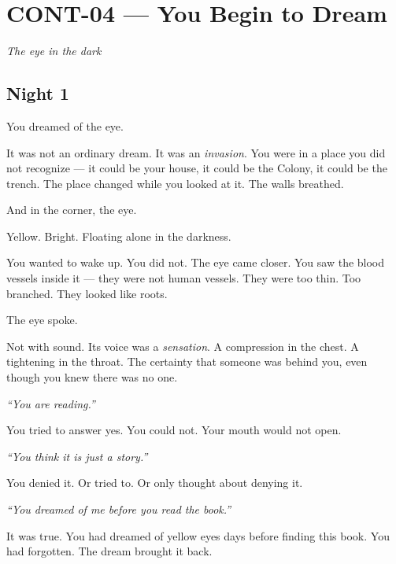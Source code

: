 \section*{\textbf{CONT-04} --- You Begin to Dream}

\noindent \textit{The eye in the dark}

\subsection*{Night 1}

\noindent You dreamed of the eye.

\noindent It was not an ordinary dream. It was an \textit{invasion}. You were in a place you did not recognize --- it could be your house, it could be the Colony, it could be the trench. The place changed while you looked at it. The walls breathed.

\noindent And in the corner, the eye.

\noindent Yellow. Bright. Floating alone in the darkness.

\noindent You wanted to wake up. You did not. The eye came closer. You saw the blood vessels inside it --- they were not human vessels. They were too thin. Too branched. They looked like roots.

\noindent The eye spoke.

\noindent Not with sound. Its voice was a \textit{sensation}. A compression in the chest. A tightening in the throat. The certainty that someone was behind you, even though you knew there was no one.

\noindent \textit{\textquotedblleft{}You are reading.\textquotedblright{}}

\noindent You tried to answer yes. You could not. Your mouth would not open.

\noindent \textit{\textquotedblleft{}You think it is just a story.\textquotedblright{}}

\noindent You denied it. Or tried to. Or only thought about denying it.

\noindent \textit{\textquotedblleft{}You dreamed of me before you read the book.\textquotedblright{}}

\noindent It was true. You had dreamed of yellow eyes days before finding this book. You had forgotten. The dream brought it back.

